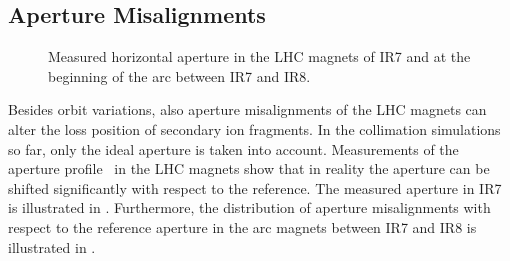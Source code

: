 \subsection{Aperture Misalignments}\label{aper:misalg}


\begin{figure}[b]
  \centering
  \caption{Measured horizontal aperture in the LHC magnets of IR7 and at the beginning of the arc between IR7 and IR8. }  
  \label{pic:16082903}
  \end{figure}


Besides orbit variations, also aperture misalignments of the LHC magnets can alter the loss position of secondary ion fragments. In the collimation simulations so far, only the ideal aperture is taken into account. Measurements of the aperture profile~\cite{EPAC08:TUPP091,lhcprojreport1056} in the LHC magnets show that in reality the aperture can be shifted significantly with respect to the reference. The measured aperture in IR7 is illustrated in . Furthermore, the distribution of aperture misalignments with respect to the reference aperture in the arc magnets between IR7 and IR8 is illustrated in .

